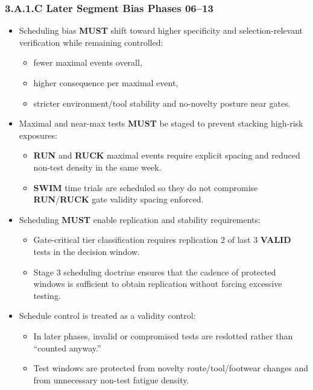 \documentclass[10pt]{article}
\begin{document}
\subsubsection*{3.A.1.C Later Segment Bias Phases 06–13}

\begin{itemize}
\item Scheduling bias \textbf{MUST} shift toward higher specificity and selection-relevant verification while remaining controlled:
  \begin{itemize}
  \item fewer maximal events overall,
  \item higher consequence per maximal event,
  \item stricter environment/tool stability and no-novelty posture near gates.
  \end{itemize}
\item Maximal and near-max tests \textbf{MUST} be staged to prevent stacking high-risk exposures:
  \begin{itemize}
  \item \textbf{RUN} and \textbf{RUCK} maximal events require explicit spacing and reduced non-test density in the same week.
  \item \textbf{SWIM} time trials are scheduled so they do not compromise \textbf{RUN}/\textbf{RUCK} gate validity spacing enforced.
  \end{itemize}
\item Scheduling \textbf{MUST} enable replication and stability requirements:
  \begin{itemize}
  \item Gate-critical tier classification requires replication 2 of last 3 \textbf{VALID} tests in the decision window.
  \item Stage 3 scheduling doctrine ensures that the cadence of protected windows is sufficient to obtain replication without forcing excessive testing.
  \end{itemize}
\item Schedule control is treated as a validity control:
  \begin{itemize}
  \item In later phases, invalid or compromised tests are reslotted rather than “counted anyway.”
  \item Test windows are protected from novelty route/tool/footwear changes and from unnecessary non-test fatigue density.
  \end{itemize}
\end{itemize}
\end{document}
